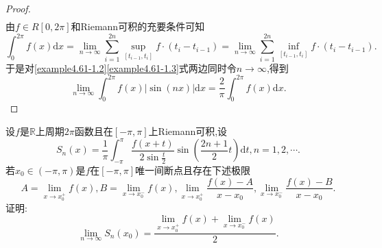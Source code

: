 \documentclass[../../main.tex]{subfiles}
\begin{document}
\begin{proof}
\begin{align}
\end{align}
由\(f\in R[0, 2\pi]\)和Riemann可积的充要条件可知
\[
\int_0^{2\pi}{f(x)\mathrm{d}x}=\lim_{n\rightarrow \infty}\sum_{i = 1}^{2n}{\sup_{[t_{i - 1}, t_i]}f\cdot(t_i - t_{i - 1})}=\lim_{n\rightarrow \infty}\sum_{i = 1}^{2n}{\inf_{[t_{i - 1}, t_i]}f\cdot(t_i - t_{i - 1})}.
\]
于是对\eqref{example4.61-1.2}\eqref{example4.61-1.3}式两边同时令\(n\rightarrow \infty\),得到
\[
\lim_{n\rightarrow \infty}\int_0^{2\pi}{f(x)|\sin(nx)|\mathrm{d}x}=\frac{2}{\pi}\int_0^{2\pi}{f(x)\mathrm{d}x}.
\]
\end{proof}

\begin{example}
设\(f\)是\(\mathbb{R}\)上周期\(2\pi\)函数且在\([-\pi,\pi]\)上Riemann可积,设
\[
S_n(x)=\frac{1}{\pi}\int_{-\pi}^{\pi}\frac{f(x + t)}{2\sin\frac{t}{2}}\sin\left(\frac{2n + 1}{2}t\right)\mathrm{d}t,n = 1,2,\cdots.
\]
若\(x_0\in(-\pi,\pi)\)是\(f\)在\([-\pi,\pi]\)唯一间断点且存在下述极限
\[
A=\lim_{x\rightarrow x_0^{+}}f(x),B=\lim_{x\rightarrow x_0^{-}}f(x),\lim_{x\rightarrow x_0^{+}}\frac{f(x)-A}{x - x_0},\lim_{x\rightarrow x_0^{-}}\frac{f(x)-B}{x - x_0}.
\]
证明:
\[
\lim\limits_{n\rightarrow\infty}S_n(x_0)=\frac{\lim\limits_{x\rightarrow x_0^{+}}f(x)+\lim\limits_{x\rightarrow x_0^{-}}f(x)}{2}.
\]
\end{example}
\end{document}
